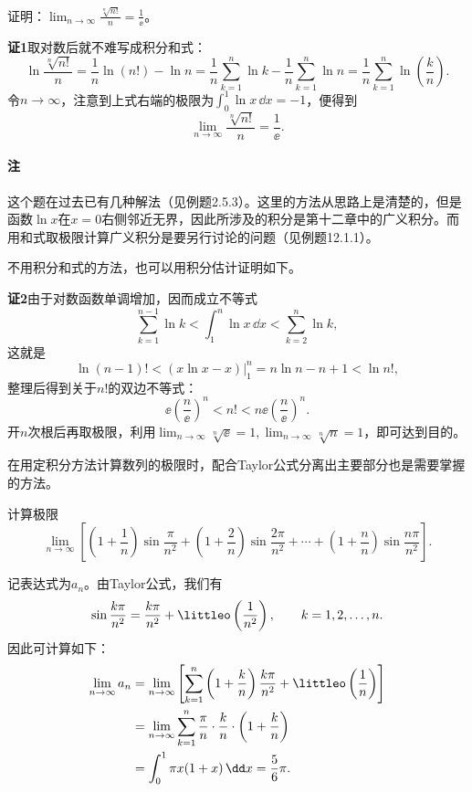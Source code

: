 \begin{xexample}[11.4.2]
证明：$\displaystyle\lim_{n\to\infty}\frac{\sqrt[n]{n!}}{n}=\frac1\ee$。
\end{xexample}
\begin{xproof}
\textbf{证1}\quad 取对数后就不难写成积分和式：
\[
  \ln\frac{\sqrt[n]{n!}}{n}
  =\frac1n\ln(n!)-\ln n
  =\frac1n\sum_{k=1}^n\ln k-\frac1n\sum_{k=1}^n\ln n
  =\frac1n\sum_{k=1}^n\ln\left(\frac kn\right).
\]
令$n\to\infty$，注意到上式右端的极限为$\int_0^1\ln x\,\dd x=-1$，便得到
\[
  \lim_{n\to\infty}\frac{\sqrt[n]{n!}}{n}=\frac1\ee.
\]

\paragraph{注} 这个题在过去已有几种解法（见例题2.5.3）。这里的方法从思路上是清楚的，但是函数$\ln x$在$x=0$右侧邻近无界，因此所涉及的积分是第十二章中的广义积分。而用和式取极限计算广义积分是要另行讨论的问题（见例题12.1.1）。

不用积分和式的方法，也可以用积分估计证明如下。

\textbf{证2}\quad 由于对数函数单调增加，因而成立不等式
\[
  \sum_{k=1}^{n-1}\ln k<\int_1^n\ln x\,\dd x<\sum_{k=2}^n\ln k,
\]
这就是
\[
  \ln(n-1)!<(x\ln x-x)\Big|_1^n=n\ln n-n+1<\ln n!,
\]
整理后得到关于$n!$的双边不等式：
\[
  \ee\left(\frac n\ee\right)^n<n!<n\ee\left(\frac n\ee\right)^n.
\]
开$n$次根后再取极限，利用$\lim_{n\to\infty}\sqrt[n]{\ee}=1,\lim_{n\to\infty}\sqrt[n]{n}=1$，即可达到目的。
\end{xproof}

在用定积分方法计算数列的极限时，配合Taylor公式分离出主要部分也是需要掌握的方法。

\begin{xexample}[11.4.3]
计算极限
\[
  \lim_{n\to\infty}\left[
  \left(1+\frac1n\right)\sin\frac\pi{n^2}
  +\left(1+\frac2n\right)\sin\frac{2\pi}{n^2}
  +\cdots+
  \left(1+\frac nn\right)\sin\frac{n\pi}{n^2}
  \right].
\]
\end{xexample}
\begin{xsolution}
记表达式为$a_n$。由Taylor公式，我们有
\[
  \sin\frac{k\pi}{n^2}=\frac{k\pi}{n^2}+\littleo\left(\frac1{n^2}\right),
  \qquad k=1,2,\ldots,n.
\]
因此可计算如下：
\begin{align*}
\lim_{n\to\infty}a_n
&=\lim_{n\to\infty}\left[
\sum_{k=1}^n\left(1+\frac kn\right)\frac{k\pi}{n^2}
+\littleo\left(\frac1n\right)
\right]\\
&=\lim_{n\to\infty}\sum_{k=1}^n\frac\pi n\cdot\frac kn\cdot\left(1+\frac kn\right)\\
&=\int_0^1\pi x(1+x)\,\dd x=\frac56\pi.
\end{align*}
\end{xsolution}

